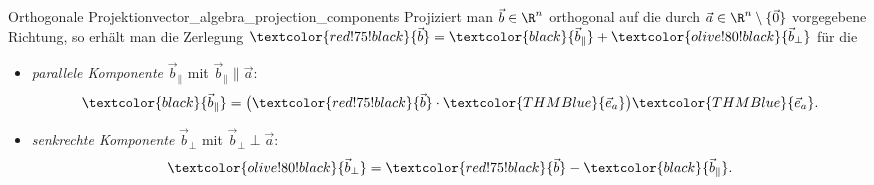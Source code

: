 \begin{TheoremBox}{Orthogonale Projektion}{vector_algebra_projection_components}
  Projiziert man $\vec b\in\R^n$ orthogonal auf die durch
  $\vec a\in\R^n\setminus\{\vec 0\}$ vorgegebene Richtung, so erhält man die
  Zerlegung
  $\textcolor{red!75!black}{\vec b}=\textcolor{black}{\vec b_{\parallel}}+\textcolor{olive!80!black}{\vec b_{\perp}}$
  für die
  \par\medskip
  \noindent
  \begin{minipage}[c]{0.54\linewidth}
    \begin{itemize}[leftmargin=1.5em,itemsep=0.8em]
      \item \emph{parallele Komponente}
        $\vec b_{\parallel}$ mit $\vec b_{\parallel}\parallel\vec a$:
        \[
          \textcolor{black}{\vec b_{\parallel}}
          =\bigl(\textcolor{red!75!black}{\vec b}\cdot
            \textcolor{THMBlue}{\vec e_a}\bigr)
            \textcolor{THMBlue}{\vec e_a}.
        \]

      \item \emph{senkrechte Komponente}
        $\vec b_{\perp}$ mit $\vec b_{\perp}\perp\vec a$:
        \[
          \textcolor{olive!80!black}{\vec b_{\perp}}
            =\textcolor{red!75!black}{\vec b}
            -\textcolor{black}{\vec b_{\parallel}}.
        \]
    \end{itemize}
  \end{minipage}\hfill
  \begin{minipage}[c]{0.43\linewidth}
    \centering
  \end{minipage}
\end{TheoremBox}


